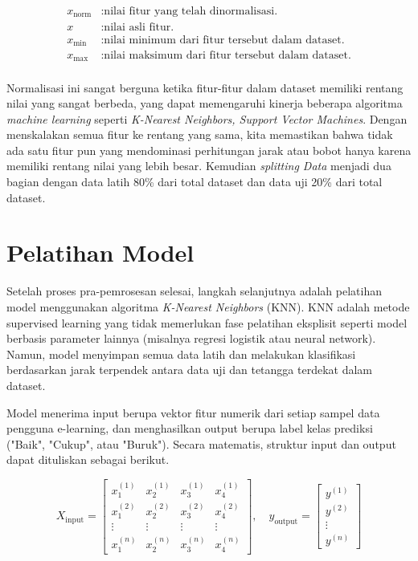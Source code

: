 \begin{align*}
 x_{\text{norm}} &   \text{:nilai fitur yang telah dinormalisasi.}\\
 x & \text{:nilai asli fitur.}\\
 x_{\min}& \text{:nilai minimum dari fitur tersebut dalam dataset.}\\
 x_{\max}&  \text{:nilai maksimum dari fitur tersebut dalam dataset.}\\
\end{align*}
\vspace{-2em}
\par Normalisasi ini sangat berguna ketika fitur-fitur dalam dataset memiliki rentang nilai yang sangat berbeda, yang dapat memengaruhi kinerja beberapa algoritma \textit{machine learning} seperti \textit{K-Nearest Neighbors, Support Vector Machines}. Dengan menskalakan semua fitur ke rentang yang sama, kita memastikan bahwa tidak ada satu fitur pun yang mendominasi perhitungan jarak atau bobot hanya karena memiliki rentang nilai yang lebih besar. Kemudian \textit{splitting Data} menjadi dua bagian dengan data latih 80\% dari total dataset dan data uji 20\% dari total dataset.


\section{Pelatihan Model}
\par Setelah proses pra-pemrosesan selesai, langkah selanjutnya adalah pelatihan model menggunakan algoritma \textit{K-Nearest Neighbors} (KNN). KNN adalah metode supervised learning yang tidak memerlukan fase pelatihan eksplisit seperti model berbasis parameter lainnya (misalnya regresi logistik atau neural network). Namun, model menyimpan semua data latih dan melakukan klasifikasi berdasarkan jarak terpendek antara data uji dan tetangga terdekat dalam dataset.

Model menerima input berupa vektor fitur numerik dari setiap sampel data pengguna e-learning, dan menghasilkan output berupa label kelas prediksi ("Baik", "Cukup", atau "Buruk"). Secara matematis, struktur input dan output dapat dituliskan sebagai berikut.

\begin{equation}
X_{\text{input}} = \begin{bmatrix}
x_1^{(1)} & x_2^{(1)} & x_3^{(1)} & x_4^{(1)} \\
x_1^{(2)} & x_2^{(2)} & x_3^{(2)} & x_4^{(2)} \\
\vdots & \vdots & \vdots & \vdots \\
x_1^{(n)} & x_2^{(n)} & x_3^{(n)} & x_4^{(n)}
\end{bmatrix}, \quad
y_{\text{output}} = \begin{bmatrix}
y^{(1)} \\
y^{(2)} \\
\vdots \\
y^{(n)}
\end{bmatrix}
\end{equation}

